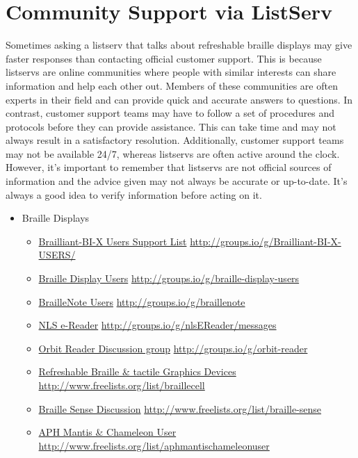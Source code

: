\documentclass[12pt,letterpaper,twoside,openright]{report}
\begin{document}
\begin{appendices}
\hypertarget{listserv2}{}\section{Community Support via ListServ}\label{listserv2}
Sometimes asking a listserv that talks about refreshable braille displays may give faster responses than contacting official customer support. This is because listservs are online communities where people with similar interests can share information and help each other out. Members of these communities are often experts in their field and can provide quick and accurate answers to questions. In contrast, customer support teams may have to follow a set of procedures and protocols before they can provide assistance. This can take time and may not always result in a satisfactory resolution. Additionally, customer support teams may not be available 24/7, whereas listservs are often active around the clock. However, it’s important to remember that listservs are not official sources of information and the advice given may not always be accurate or up-to-date. It’s always a good idea to verify information before acting on it.
\begin{itemize}[leftmargin=*]
\item Braille Displays
\begin{itemize}[leftmargin=2em]
\item \href{http://groups.io/g/Brailliant-BI-X-USERS/}{Brailliant-BI-X Users Support List}  \break\url{http://groups.io/g/Brailliant-BI-X-USERS/} 
\item \href{http://groups.io/g/braille-display-users}{Braille Display Users}  \break\url{http://groups.io/g/braille-display-users}
\item \href{http://groups.io/g/braillenote}{BrailleNote Users}  \break\url{http://groups.io/g/braillenote}
\item \href{http://groups.io/g/nlsEReader/messages}{NLS e-Reader}  \break\url{http://groups.io/g/nlsEReader/messages}
\item \href{http://groups.io/g/orbit-reader}{Orbit Reader Discussion group}  \break\url{http://groups.io/g/orbit-reader}
\item \href{http://www.freelists.org/list/braillecell}{Refreshable Braille \& tactile Graphics Devices}  \break\url{http://www.freelists.org/list/braillecell}
\item \href{http://www.freelists.org/list/braille-sense}{Braille Sense Discussion}  \break\url{http://www.freelists.org/list/braille-sense}
\item \href{http://www.freelists.org/list/aphmantischameleonuser}{APH Mantis \& Chameleon User}  \break\url{http://www.freelists.org/list/aphmantischameleonuser}

\end{itemize}
\end{itemize}
\end{appendices}
\end{document}
